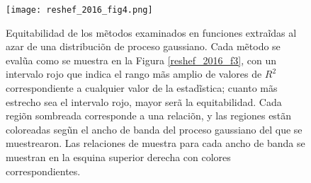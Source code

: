 	\begin{figure}[H] 
		\centering
		\texttt{[image: reshef\_2016\_fig4.png]}
		\caption{Equitabilidad de los m\~etodos examinados en funciones extra\~idas al azar de una distribuci\~on de proceso gaussiano. Cada m\~etodo se eval\~ua como se muestra en la Figura \ref{reshef_2016_f3}, con un intervalo rojo que indica el rango m\~as amplio de valores de $R^2$ correspondiente a cualquier valor de la estad\~istica; cuanto m\~as estrecho sea el intervalo rojo, mayor ser\~a la equitabilidad. Cada regi\~on sombreada corresponde a una relaci\~on, y las regiones est\~an coloreadas seg\~un el ancho de banda del proceso gaussiano del que se muestrearon. Las relaciones de muestra para cada ancho de banda se muestran en la esquina superior derecha con colores correspondientes.}
		\label{reshef_2016_f4}
	\end{figure}